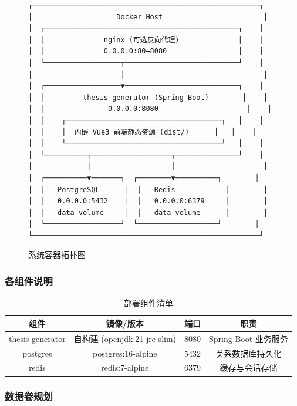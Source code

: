\documentclass{../../softeng}
\begin{document}
\begin{figure}[htbp]
\centering
\begin{verbatim}
┌──────────────────────────────────────────────────────┐
│                    Docker Host                        │
│  ┌──────────────────────────────────────────────┐    │
│  │              nginx (可选反向代理)              │    │
│  │              0.0.0.0:80→8080                 │    │
│  └──────────────────┬───────────────────────────┘    │
│                     │                                 │
│  ┌──────────────────▼───────────────────────────┐    │
│  │         thesis-generator (Spring Boot)        │    │
│  │               0.0.0.0:8080                     │    │
│  │    ┌─────────────────────────────────────┐   │    │
│  │    │  内嵌 Vue3 前端静态资源 (dist/)      │   │    │
│  │    └─────────────────────────────────────┘   │    │
│  └──────────┬───────────────────┬───────────────┘    │
│             │                   │                     │
│  ┌──────────▼───────┐  ┌────────▼──────────┐        │
│  │   PostgreSQL      │  │   Redis            │        │
│  │   0.0.0.0:5432    │  │   0.0.0.0:6379     │        │
│  │   data volume     │  │   data volume      │        │
│  └──────────────────┘  └───────────────────┘        │
└──────────────────────────────────────────────────────┘
\end{verbatim}
\caption{系统容器拓扑图}
\label{fig:deploy-topology}
\end{figure}

\subsubsection{各组件说明}

\begin{table}[htbp]
\centering
\caption{部署组件清单}
\label{tab:deploy-components}
\begin{tabular}{|c|c|c|c|}
\hline
\textbf{组件} & \textbf{镜像/版本} & \textbf{端口} & \textbf{职责} \\
\hline
thesis-generator & 自构建 (openjdk:21-jre-slim) & 8080 & Spring Boot 业务服务 \\
\hline
postgres & postgres:16-alpine & 5432 & 关系数据库持久化 \\
\hline
redis & redis:7-alpine & 6379 & 缓存与会话存储 \\
\hline
\end{tabular}
\end{table}

\subsubsection{数据卷规划}
\end{document}
